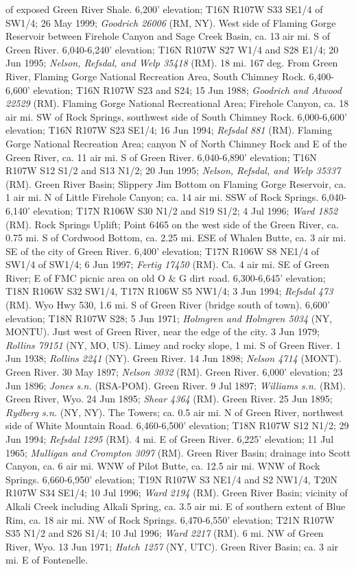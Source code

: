 of exposed Green River Shale. 6,200' elevation; T16N R107W S33 SE1/4 of SW1/4; 26 May 1999; \textit{Goodrich 26006} (RM, NY).  West side of Flaming Gorge Reservoir between Firehole Canyon and Sage Creek Basin, ca. 13 air mi. S of Green River. 6,040-6,240' elevation; T16N R107W S27 W1/4 and S28 E1/4; 20 Jun 1995; \textit{Nelson, Refsdal, and Welp 35418} (RM).  18 mi. 167 deg. From Green River, Flaming Gorge National Recreation Area, South Chimney Rock. 6,400-6,600' elevation; T16N R107W S23 and S24; 15 Jun 1988; \textit{Goodrich and Atwood 22529} (RM).  Flaming Gorge National Recreational Area; Firehole Canyon, ca. 18 air mi. SW of Rock Springs, southwest side of South Chimney Rock. 6,000-6,600' elevation; T16N R107W S23 SE1/4; 16 Jun 1994; \textit{Refsdal 881} (RM).  Flaming Gorge National Recreation Area; canyon N of North Chimney Rock and E of the Green River, ca. 11 air mi. S of Green River. 6,040-6,890' elevation; T16N R107W S12 S1/2 and S13 N1/2; 20 Jun 1995; \textit{Nelson, Refsdal, and Welp 35337} (RM).  Green River Basin; Slippery Jim Bottom on Flaming Gorge Reservoir, ca. 1 air mi. N of Little Firehole Canyon; ca. 14 air mi. SSW of Rock Springs. 6,040-6,140' elevation; T17N R106W S30 N1/2 and S19 S1/2; 4 Jul 1996; \textit{Ward 1852} (RM).  Rock Springs Uplift; Point 6465 on the west side of the Green River, ca. 0.75 mi. S of Cordwood Bottom, ca. 2.25 mi. ESE of Whalen Butte, ca. 3 air mi. SE of the city of Green River. 6,400' elevation; T17N R106W S8 NE1/4 of SW1/4 of SW1/4; 6 Jun 1997; \textit{Fertig 17450} (RM).  Ca. 4 air mi. SE of Green River; E of FMC picnic area on old O \& G dirt road. 6,300-6,645' elevation; T18N R106W S32 SW1/4, T17N R106W S5 NW1/4; 3 Jun 1994; \textit{Refsdal 473} (RM).  Wyo Hwy 530, 1.6 mi. S of Green River (bridge south of town). 6,600' elevation; T18N R107W S28; 5 Jun 1971; \textit{Holmgren and Holmgren 5034} (NY, MONTU).  Just west of Green River, near the edge of the city. 3 Jun 1979; \textit{Rollins 79151} (NY, MO, US).  Limey and rocky slope, 1 mi. S of Green River. 1 Jun 1938; \textit{Rollins 2241} (NY).  Green River. 14 Jun 1898; \textit{Nelson 4714} (MONT).  Green River. 30 May 1897; \textit{Nelson 3032} (RM).  Green River. 6,000' elevation; 23 Jun 1896; \textit{Jones s.n.} (RSA-POM).  Green River. 9 Jul 1897; \textit{Williams s.n.} (RM).  Green River, Wyo. 24 Jun 1895; \textit{Shear 4364} (RM).  Green River. 25 Jun 1895; \textit{Rydberg s.n.} (NY, NY).  The Towers; ca. 0.5 air mi. N of Green River, northwest side of White Mountain Road. 6,460-6,500' elevation; T18N R107W S12 N1/2; 29 Jun 1994; \textit{Refsdal 1295} (RM).  4 mi. E of Green River. 6,225' elevation; 11 Jul 1965; \textit{Mulligan and Crompton 3097} (RM).  Green River Basin; drainage into Scott Canyon, ca. 6 air mi. WNW of Pilot Butte, ca. 12.5 air mi. WNW of Rock Springs. 6,660-6,950' elevation; T19N R107W S3 NE1/4 and S2 NW1/4, T20N R107W S34 SE1/4; 10 Jul 1996; \textit{Ward 2194} (RM).  Green River Basin; vicinity of Alkali Creek including Alkali Spring, ca. 3.5 air mi. E of southern extent of Blue Rim, ca. 18 air mi. NW of Rock Springs. 6,470-6,550' elevation; T21N R107W S35 N1/2 and S26 S1/4; 10 Jul 1996; \textit{Ward 2217} (RM).  6 mi. NW of Green River, Wyo. 13 Jun 1971; \textit{Hatch 1257} (NY, UTC).  Green River Basin; ca. 3 air mi. E of Fontenelle.  